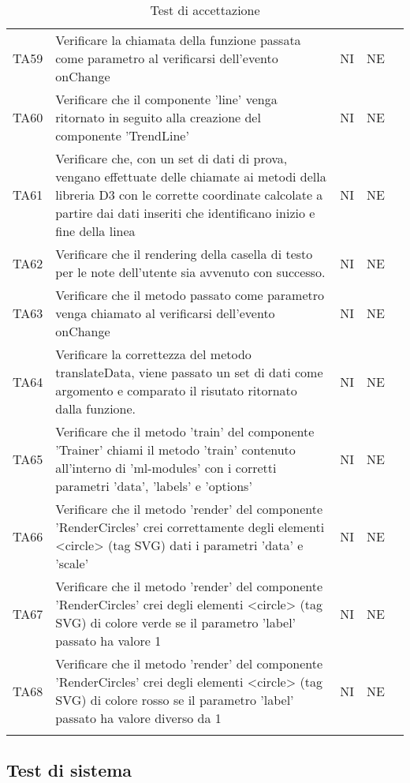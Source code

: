 \begin{longtable} {
		>{}p{15mm} 
		>{}p{79.5mm}
		>{}p{15mm} 
		>{}p{15mm}
		>{}p{0mm}}
	TA59	& Verificare la chiamata della funzione passata come parametro al verificarsi dell'evento onChange & NI & NE &\TBstrut \\ [2mm]
	TA60	& Verificare che il componente 'line' venga ritornato in seguito alla creazione del componente 'TrendLine' & NI & NE &\TBstrut \\ [2mm]
	TA61	& Verificare che, con un set di dati di prova, vengano effettuate delle chiamate ai metodi della libreria D3 con le corrette coordinate calcolate a partire dai dati inseriti che identificano inizio e fine della linea & NI & NE &\TBstrut \\ [2mm]
	TA62	& Verificare che il rendering della casella di testo per le note dell'utente sia avvenuto con successo. & NI & NE &\TBstrut \\ [2mm]
	TA63	& Verificare che il metodo passato come parametro venga chiamato al verificarsi dell'evento onChange & NI & NE &\TBstrut \\ [2mm]
	TA64	& Verificare la correttezza del metodo translateData, viene passato un set di dati come argomento e comparato il risutato ritornato dalla funzione. & NI & NE &\TBstrut \\ [2mm]
	TA65	& Verificare che il metodo 'train' del componente 'Trainer' chiami il metodo 'train' contenuto all'interno di 'ml-modules' con i corretti parametri 'data', 'labels' e 'options' & NI & NE &\TBstrut \\ [2mm]
	TA66	& Verificare che il metodo 'render' del componente 'RenderCircles' crei correttamente degli elementi <circle> (tag SVG) dati i parametri 'data' e 'scale' & NI & NE &\TBstrut \\ [2mm]
	TA67	& Verificare che il metodo 'render' del componente 'RenderCircles' crei degli elementi <circle> (tag SVG) di colore verde se il parametro 'label' passato ha valore 1 & NI & NE &\TBstrut \\ [2mm]
	TA68	& Verificare che il metodo 'render' del componente 'RenderCircles' crei degli elementi <circle> (tag SVG) di colore rosso se il parametro 'label' passato ha valore diverso da 1 & NI & NE &\TBstrut \\ [2mm]
	\rowcolor{white}
	\caption{Test di accettazione}
\end{longtable}


\subsection{Test di sistema}


